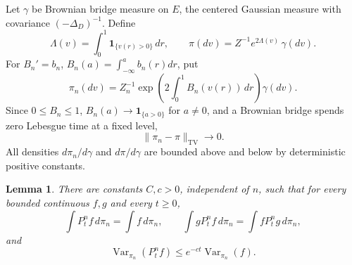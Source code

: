 \documentclass[12pt]{article}
\newtheorem{lemma}{Lemma}
\newcommand{\1}{\mathbf 1}
\newcommand{\Var}{\operatorname{Var}}
\newcommand{\TV}{\operatorname{TV}}
\begin{document}
Let \(\gamma\) be Brownian bridge measure on \(E\), the centered Gaussian
measure with covariance \((-\Delta_D)^{-1}\).  Define
\[
  \Lambda(v)=\int_0^1\1_{\{v(r)>0\}}\,dr,\qquad
  \pi(dv)=Z^{-1}e^{2\Lambda(v)}\,\gamma(dv).                 \tag{13}
\]
For \(B_n'=b_n\), \(B_n(a)=\int_{-\infty}^ab_n(r)dr\), put
\[
   \pi_n(dv)=Z_n^{-1}\exp\left(2\int_0^1B_n(v(r))\,dr\right)\gamma(dv).
\]
Since \(0\le B_n\le1\), \(B_n(a)\to\1_{\{a>0\}}\) for \(a\ne0\), and a
Brownian bridge spends zero Lebesgue time at a fixed level,
\[
        \|\pi_n-\pi\|_{\TV}\to0 .                            \tag{14}
\]
All densities \(d\pi_n/d\gamma\) and \(d\pi/d\gamma\) are bounded above and
below by deterministic positive constants.

\begin{lemma}\label{lem:reggap}
There are constants \(C,c>0\), independent of \(n\), such that for every
bounded continuous \(f,g\) and every \(t\ge0\),
\[
 \int P_t^n f\,d\pi_n=\int f\,d\pi_n,\qquad
 \int gP_t^n f\,d\pi_n=\int fP_t^n g\,d\pi_n,                \tag{15}
\]
and
\[
        \Var_{\pi_n}(P_t^n f)\le e^{-ct}\Var_{\pi_n}(f).      \tag{16}
\]
\end{lemma}
\end{document}
